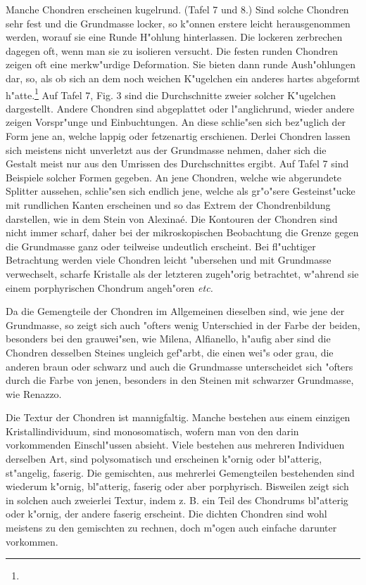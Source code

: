 \documentclass[a4paper, 11pt, oneside, polutonikogreek, german]{article}
\begin{document}
Manche Chondren erscheinen kugelrund. (Tafel 7 und 8.) Sind solche Chondren sehr fest und die Grundmasse locker, so k"onnen erstere leicht herausgenommen werden, worauf sie eine Runde H"ohlung hinterlassen. Die lockeren zerbrechen dagegen oft, wenn man sie zu isolieren versucht. Die festen runden Chondren zeigen oft eine merkw"urdige Deformation. Sie bieten dann runde Aush"ohlungen dar, so, als ob sich an dem noch weichen K"ugelchen ein anderes hartes abgeformt h"atte.\footnote{} Auf Tafel 7, Fig. 3 sind die Durchschnitte zweier solcher K"ugelchen dargestellt. Andere Chondren sind abgeplattet oder l"anglichrund, wieder andere zeigen Vorspr"unge und Einbuchtungen. An diese schlie"sen sich bez"uglich der Form jene an, welche lappig oder fetzenartig erschienen. Derlei Chondren lassen sich meistens nicht unverletzt aus der Grundmasse nehmen, daher sich die Gestalt meist nur aus den Umrissen des Durchschnittes ergibt. Auf Tafel 7 sind Beispiele solcher Formen gegeben. An jene Chondren, welche wie abgerundete Splitter aussehen, schlie"sen sich endlich jene, welche als gr"o"sere Gesteinst"ucke mit rundlichen Kanten erscheinen und so das Extrem der Chondrenbildung darstellen, wie in dem Stein von Alexinaé. Die Kontouren der Chondren sind nicht immer scharf, daher bei der mikroskopischen Beobachtung die Grenze gegen die Grundmasse ganz oder teilweise undeutlich erscheint. Bei fl"uchtiger Betrachtung werden viele Chondren leicht "ubersehen und mit Grundmasse verwechselt, scharfe Kristalle als der letzteren zugeh"orig betrachtet, w"ahrend sie einem porphyrischen Chondrum angeh"oren \emph{etc.}

Da die Gemengteile der Chondren im Allgemeinen dieselben sind, wie jene der Grundmasse, so zeigt sich auch "ofters wenig Unterschied in der Farbe der beiden, besonders bei den grauwei"sen, wie Milena, Alfianello, h"aufig aber sind die Chondren desselben Steines ungleich gef"arbt, die einen wei"s oder grau, die anderen braun oder schwarz und auch die Grundmasse unterscheidet sich "ofters durch die Farbe von jenen, besonders in den Steinen mit schwarzer Grundmasse, wie Renazzo.

Die Textur der Chondren ist mannigfaltig. Manche bestehen aus einem einzigen Kristallindividuum, sind monosomatisch, wofern man von den darin vorkommenden Einschl"ussen absieht. Viele bestehen aus mehreren Individuen derselben Art, sind polysomatisch und erscheinen k"ornig oder bl"atterig, st"angelig, faserig. Die gemischten, aus mehrerlei Gemengteilen bestehenden sind wiederum k"ornig, bl"atterig, faserig oder aber porphyrisch. Bisweilen zeigt sich in solchen auch zweierlei Textur, indem z. B. ein Teil des Chondrums bl"atterig oder k"ornig, der andere faserig erscheint. Die dichten Chondren sind wohl meistens zu den gemischten zu rechnen, doch m"ogen auch einfache darunter vorkommen.
\end{document}
